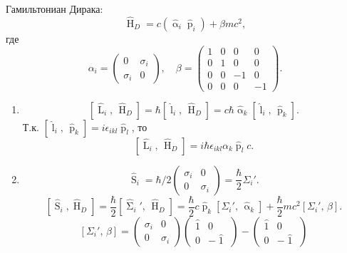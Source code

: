 \documentclass[a4paper]{article}
\begin{document}
\begin{sol}
Гамильтониан Дирака:
\[
	\widehat{\operatorname{H}}_D=c \left( 
	\widehat{\operatorname{\alpha}}_i \widehat{\operatorname{p}}_i\right) +\beta m c^2
,\]
где
\[
	\alpha_i= \begin{pmatrix} 0 & \sigma_i \\
	\sigma_i & 0\end{pmatrix} ,\quad
		\beta=\begin{pmatrix} 1&0&0&0\\0&1&0&0\\
		0&0&-1&0\\0&0&0&-1\end{pmatrix} 
.\] 
\begin{enumerate}
\item \[
\left[ \widehat{\operatorname{L}}_i,\,\widehat{\operatorname{H}}_D \right] =
\hbar \left[ \widehat{\operatorname{l}}_i,\,
\widehat{\operatorname{H}}_D\right] =
c \hbar  \widehat{\operatorname{\alpha}}_k\left[ \widehat{\operatorname{l}}_i,\,\widehat{\operatorname{p}}_k \right] 
.\] 
Т.\:к. $\left[ \widehat{\operatorname{l}}_i,\,\widehat{\operatorname{p}}_k \right] = i \epsilon _{ikl} \widehat{\operatorname{p}}_l$, то
\[
\left[ \widehat{\operatorname{L}}_i,\,\widehat{\operatorname{H}}
_D\right] = i \hbar  \epsilon _{ikl} \alpha_k 
\widehat{\operatorname{p}}_l c
.\] 
\item 
\[
\widehat{\operatorname{S}}_i= \hbar /2
\begin{pmatrix} \sigma_i & 0 \\ 0 & \sigma_i \end{pmatrix} =
\frac{\hbar}{2} \Sigma_i'
.\] 
\[
\left[ \widehat{\operatorname{S}}_i, \widehat{\operatorname{H}}_D \right] = \frac{\hbar}{2}
\left[ \widehat{\operatorname{\Sigma}}_i',\,\widehat{\operatorname{H}}_D \right] =
\frac{\hbar}{2} c \widehat{\operatorname{p}}_k \left[ 
\Sigma_i',\,\widehat{\operatorname{\alpha}}_k\right] +
\frac{\hbar }{2} m c^2 \left[ 
\Sigma_i',\,\beta\right] 
.\] 
\[
\left[ \Sigma_i',\,\beta \right] =
\begin{pmatrix} \sigma_i & 0 \\ 0 & \sigma_i \end{pmatrix} 
\begin{pmatrix} \widehat{\operatorname{1}} & 0 \\ 0&-\widehat{\operatorname{1}} \end{pmatrix} -
\begin{pmatrix} \widehat{\operatorname{1}}& 0\\ 0 &
-\widehat{\operatorname{1}}\end{pmatrix} 
\]
\end{enumerate}
\end{sol}
\end{document}
